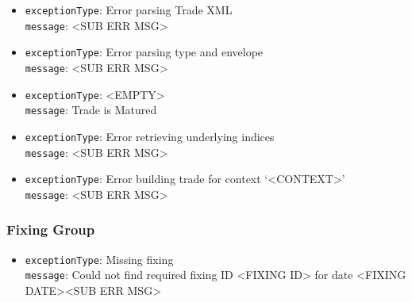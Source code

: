\begin{itemize}
  \item \lstinline!exceptionType!: Error parsing Trade XML \\
        \lstinline!message!: <SUB ERR MSG>

  \item \lstinline!exceptionType!: Error parsing type and envelope \\
        \lstinline!message!: <SUB ERR MSG>

  \item \lstinline!exceptionType!: <EMPTY> \\
        \lstinline!message!: Trade is Matured
  
  \item \lstinline!exceptionType!: Error retrieving underlying indices \\
        \lstinline!message!: <SUB ERR MSG>

  \item \lstinline!exceptionType!: Error building trade for context `<CONTEXT>' \\
        \lstinline!message!: <SUB ERR MSG>

  \ifdefined\UserGuide
  \else
    
  \fi

\end{itemize}

\subsubsection*{Fixing Group}

\begin{itemize}

  \item \lstinline!exceptionType!: Missing fixing \\
        \lstinline!message!: Could not find required fixing ID <FIXING ID> for date <FIXING DATE><SUB ERR MSG>

  \ifdefined\UserGuide
  \else
    
  \fi


\end{itemize}
